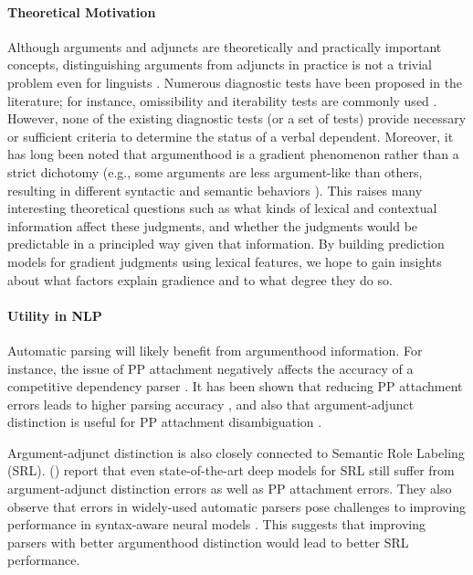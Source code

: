 \documentclass[letterpaper]{article} %
\begin{document}
\paragraph{Theoretical Motivation} Although arguments and adjuncts are theoretically and practically important concepts, distinguishing arguments from adjuncts in practice is not a trivial problem even for linguists \cite{schutze1995pp}. Numerous diagnostic tests have been proposed in the literature; for instance, omissibility and iterability tests are commonly used \cite{pollard1987information}. However, none of the existing diagnostic tests (or a set of tests) provide necessary or sufficient criteria to determine the status of a verbal dependent. Moreover, it has long been noted that argumenthood is a gradient phenomenon rather than a strict dichotomy (e.g., some arguments are less argument-like than others, resulting in different syntactic and semantic behaviors \cite{rissman2015using}). This raises many interesting theoretical questions such as what kinds of lexical and contextual information affect these judgments, and whether the judgments would be predictable in a principled way given that information. By building prediction models for gradient judgments using lexical features, we hope to gain insights about what factors explain gradience and to what degree they do so.

\paragraph{Utility in NLP} Automatic parsing will likely benefit from argumenthood information. For instance, the issue of PP attachment negatively affects the accuracy of a competitive dependency parser \cite{dasigi2017ontology}. It has been shown that reducing PP attachment errors leads to higher parsing accuracy \cite{agirre2008improving,belinkov2014exploring}, and also that argument-adjunct distinction is useful for PP attachment disambiguation \cite{merlo2006notion}.

Argument-adjunct distinction is also closely connected to Semantic Role Labeling (SRL). \citeauthor{he2017deep} (\citeyear{he2017deep}) report that even state-of-the-art deep models for SRL still suffer from argument-adjunct distinction errors as well as PP attachment errors. They also observe that errors in widely-used automatic parsers pose challenges to improving performance in syntax-aware neural models \cite{marcheggiani2017encoding}. This suggests that improving parsers with better argumenthood distinction would lead to better SRL performance.
\end{document}
